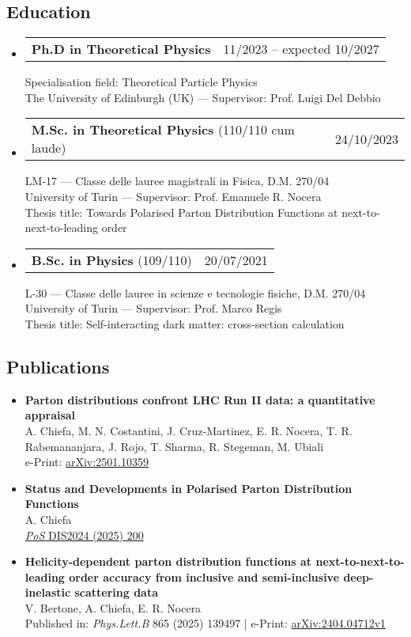 \documentclass[10pt,a4paper]{article}
\makeatletter
\newcommand{\headerrow}[2]
{\begin{tabular*}{\linewidth}{l@{\extracolsep{\fill}}r}
	#1 &
	#2 \\
\end{tabular*}}
\makeatother
\begin{document}
\subsection*{Education}
\begin{itemize}[leftmargin=1em]
  \item[] 
  \headerrow
		{\textbf{Ph.D in Theoretical Physics}}
    {11/2023 – expected 10/2027}
    Specialisation field: Theoretical Particle Physics\\
    The University of Edinburgh (UK) — Supervisor: Prof. Luigi Del Debbio
  \item[]
  \headerrow
    {\textbf{M.Sc. in Theoretical Physics} (110/110 cum laude)}
    {24/10/2023}
    LM-17 — Classe delle lauree magistrali in Fisica, D.M. 270/04\\
    University of Turin — Supervisor: Prof. Emanuele R. Nocera\\
    Thesis title: Towards Polarised Parton Distribution Functions at next-to-next-to-leading order
  \item[]
  \headerrow
    {\textbf{B.Sc. in Physics} (109/110)}
    {20/07/2021}
    L-30 — Classe delle lauree in scienze e tecnologie fisiche, D.M. 270/04\\
    University of Turin — Supervisor: Prof. Marco Regis\\
    Thesis title: Self-interacting dark matter: cross-section calculation
\end{itemize}

\subsection*{Publications}
\begin{itemize}[leftmargin=1em]
    \item[] 
      \textbf{Parton distributions confront LHC Run II data: a quantitative appraisal} \\
      A. Chiefa, M. N. Costantini, J. Cruz-Martinez, E. R. Nocera, T. R. Rabemananjara, J. Rojo, T. Sharma, R. Stegeman, M. Ubiali \\
      e-Print: \href{https://arxiv.org/abs/2501.10359}{arXiv:2501.10359}
    \item[] 
      \textbf{Status and Developments in Polarised Parton Distribution Functions} \\
      A. Chiefa\\
      \href{https://pos.sissa.it/469/200/pdf}{\textit{PoS} DIS2024 (2025) 200}
    \item[]
      \textbf{Helicity-dependent parton distribution functions at next-to-next-to-leading order accuracy from inclusive and semi-inclusive deep-inelastic scattering data} \\
      V. Bertone, A. Chiefa, E. R. Nocera \\
      Published in: {\it Phys.Lett.B} 865 (2025) 139497 | e-Print: \href{https://arxiv.org/pdf/2404.04712}{arXiv:2404.04712v1}
\end{itemize}
\end{document}
